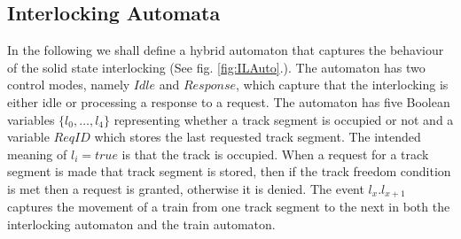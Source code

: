 \subsection*{Interlocking Automata}
In the following we shall define a hybrid automaton that captures the behaviour of the solid state interlocking (See fig. \ref{fig:ILAuto}.).  The automaton has two control modes, namely $Idle$ and $Response$, which capture that the interlocking is either idle or processing a response to a request.  The automaton has five Boolean variables $\{ l_0, \ldots ,l_4 \}$ representing whether a track segment is occupied or not and a variable $ReqID$ which stores the last requested track segment. The intended meaning of $l_i = true$ is that the track is occupied.  When a request for a track segment is made that track segment is stored, then if the track freedom condition is met then a request is granted, otherwise it is denied. The event $l_x.l_{x+1}$ captures the movement of a train from one track segment to the next in both the interlocking automaton and the train automaton.
\medskip
